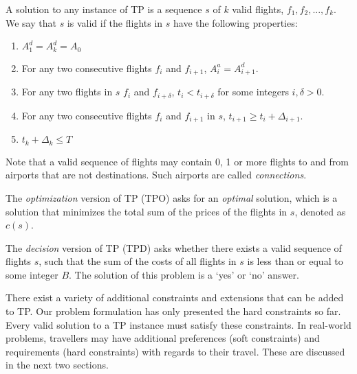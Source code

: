 \documentclass{article}
\theoremstyle{definition}
\begin{document}
A solution to any instance of TP is a sequence $s$ of $k$ valid flights, ${f_{1}, f_{2},...,f_{k}}$. We say that $s$ is valid if the flights in $s$ have the following properties:

\begin{enumerate}
\item %
$A^{d}_{1} = A^{d}_{k} = A_{0}$

\item For any two consecutive flights $f_{i}$ and $f_{i+1}$, $A^{a}_{i} = A^{d}_{i+1}$.

\item For any two flights in $s$ $f_{i}$ and $f_{i+\delta}$, $t_{i} < t_{i+\delta}$ for some integers $i,\delta > 0$.

\item For any two consecutive flights $f_{i}$ and $f_{i+1}$ in $s$, $t_{i+1} \geq t_{i} + \Delta_{i+1} $.

\item $t_{k} + \Delta_{k} \leq T$

\end{enumerate}

Note that a valid sequence of flights may contain 0, 1 or more flights to and from airports that are not destinations. Such airports are called \textit{connections}.

The \textit{optimization} version of TP (TPO) asks for an \textit{optimal} solution, which is a solution that minimizes the total sum of the prices of the flights in $s$, denoted as $c(s)$.

The \textit{decision} version of TP (TPD) asks whether there exists a valid sequence of flights $s$, such that the sum of the costs of all flights in $s$ is less than or equal to some integer $B$. The solution of this problem is a `yes' or `no' answer.

There exist a variety of additional constraints and extensions that can be added to TP. Our problem formulation has only presented the hard constraints so far. Every valid solution to a TP instance must satisfy these constraints. In real-world problems, travellers may have additional preferences (soft constraints) and requirements (hard constraints) with regards to their travel. These are discussed in the next two sections.
\end{document}

